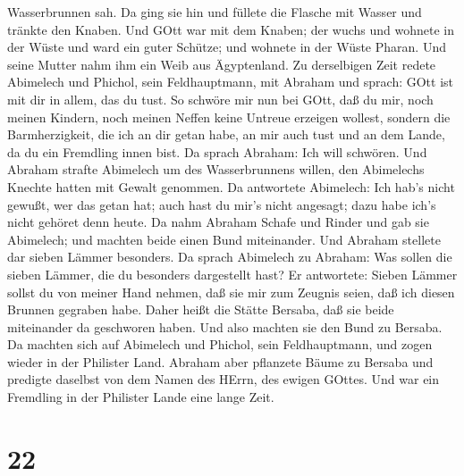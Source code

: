 Wasserbrunnen sah. Da ging sie hin und füllete die Flasche mit Wasser
und tränkte den Knaben.  Und GOtt war mit dem Knaben; der
wuchs und wohnete in der Wüste und ward ein guter Schütze; 
und wohnete in der Wüste Pharan. Und seine Mutter nahm ihm ein Weib aus
Ägyptenland.  Zu derselbigen Zeit redete Abimelech und
Phichol, sein Feldhauptmann, mit Abraham und sprach: GOtt ist mit dir in
allem, das du tust.  So schwöre mir nun bei GOtt, daß du
mir, noch meinen Kindern, noch meinen Neffen keine Untreue erzeigen
wollest, sondern die Barmherzigkeit, die ich an dir getan habe, an mir
auch tust und an dem Lande, da du ein Fremdling innen bist.
 Da sprach Abraham: Ich will schwören.  Und
Abraham strafte Abimelech um des Wasserbrunnens willen, den Abimelechs
Knechte hatten mit Gewalt genommen.  Da antwortete
Abimelech: Ich hab's nicht gewußt, wer das getan hat; auch hast du mir's
nicht angesagt; dazu habe ich's nicht gehöret denn heute. 
Da nahm Abraham Schafe und Rinder und gab sie Abimelech; und machten
beide einen Bund miteinander.  Und Abraham stellete dar
sieben Lämmer besonders.  Da sprach Abimelech zu Abraham:
Was sollen die sieben Lämmer, die du besonders dargestellt hast?
 Er antwortete: Sieben Lämmer sollst du von meiner Hand
nehmen, daß sie mir zum Zeugnis seien, daß ich diesen Brunnen gegraben
habe.  Daher heißt die Stätte Bersaba, daß sie beide
miteinander da geschworen haben.  Und also machten sie den
Bund zu Bersaba. Da machten sich auf Abimelech und Phichol, sein
Feldhauptmann, und zogen wieder in der Philister Land. 
Abraham aber pflanzete Bäume zu Bersaba und predigte daselbst von dem
Namen des HErrn, des ewigen GOttes.  Und war ein Fremdling
in der Philister Lande eine lange Zeit.

\hypertarget{section-21}{%
\section{22}\label{section-21}}

